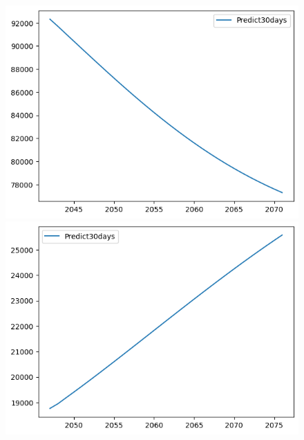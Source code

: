 \begin{figure}[H]
\begin{minipage}{0.15\textwidth}
    \includegraphics[width=1\textwidth]{resources/chapter-5/predicted/VCB_GRU_8-2_30days.png}
    \end{minipage}
    \hfill
        \begin{minipage}{0.15\textwidth}
    \centering
    \includegraphics[width=1\textwidth]{resources/chapter-5/predicted/VCB_GRU_9-1_30days.png}
    \end{minipage}
    \hfill
    \begin{minipage}{0.15\textwidth}
    \centering

\end{minipage}
\end{figure}

